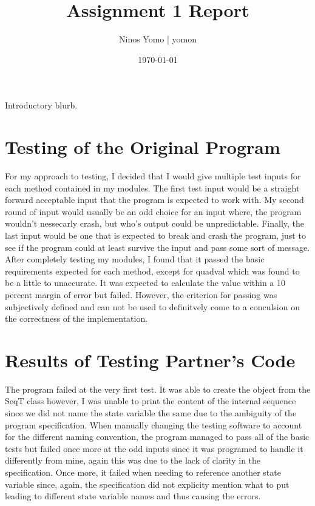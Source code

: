 \documentclass[12pt]{article}
\title{Assignment 1 Report}
\author{Ninos Yomo | yomon}
\date{\today}
\begin{document}
\maketitle

Introductory blurb.

\section{Testing of the Original Program}

For my approach to testing, I decided that I would give multiple test inputs for
each method contained in my modules. The first test input would be a straight
forward acceptable input that the program is expected to work with. My second
round of input would usually be an odd choice for an input where, the program
wouldn't nessecarly crash, but who's output could be unpredictable. Finally, the
last input would be one that is expected to break and crash the program, just to
see if the program could at least survive the input and pass some sort of message.
After completely testing my modules, I found that it passed the basic requirements
expected for each method, except for quadval which was found to be a little to
unaccurate. It was expected to calculate the value within a 10 percent margin of
error but failed. However, the criterion for passing was subjectively defined and
can not be used to definitvely come to a conculsion on the correctness of the 
implementation.

\section{Results of Testing Partner's Code}

The program failed at the very first test. It was able to create the object from
the SeqT class however, I was unable to print the content of the internal sequence
since we did not name the state variable the same due to the ambiguity of the 
program specification. When manually changing the testing software to account
for the different naming convention, the program managed to pass all of the 
basic tests but failed once more at the odd inputs since it was programed to 
handle it differently from mine, again this was due to the lack of clarity
in the specification. Once more, it failed when needing to reference another state
variable since, again, the specification did not explicity mention what to put
leading to different state variable names and thus causing the errors.
\end{document}

